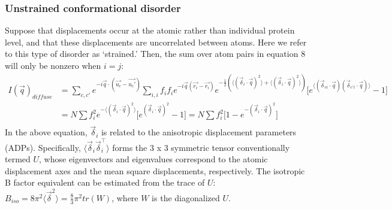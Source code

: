 \documentclass{article}
\begin{document}
\subsubsection{Unstrained conformational disorder} Suppose that displacements occur at the atomic rather than individual protein level, and that these displacements are uncorrelated between atoms. Here we refer to this type of disorder as `strained.' Then, the sum over atom pairs in equation 8 will only be nonzero when $i = j$:
\begin{equation}
\begin{aligned}
I(\vec{q})_{diffuse} & = \sum\limits_{c,c'} e^{-i \vec{q} \cdot (\vec{u_c} - \vec{u_c'})} \sum\limits_{i,i} f_i f_i e^{-i \vec{q} (\vec{r_i} - \vec{r_i})} e^{-\frac{1}{2} (\langle (\vec{\delta}_i \cdot \vec{q})^2 \rangle + \langle (\vec{\delta}_i \cdot \vec{q})^2 \rangle) } \lbrack e^{\langle ( \vec{\delta}_{ci} \cdot \vec{q} ) ( \vec{\delta}_{c'i} \cdot \vec{q} ) \rangle} - 1 \rbrack \\
& = N \sum f_i^2 e^{-\langle (\vec{\delta}_i \cdot \vec{q})^2 \rangle } \lbrack e^{ ( \vec{\delta}_{i} \cdot \vec{q} )^2 } - 1 \rbrack = N \sum f_i^2 \lbrack 1 - e^{- (\vec{\delta}_i \cdot \vec{q})^2 } \rbrack \\
\end{aligned}
\end{equation}
In the above equation, $\vec{\delta}_i$ is related to the anisotropic displacement parameters (ADPs). Specifically, $ \langle \vec{\delta}_i \vec{\delta}_i^\intercal \rangle $ forms the 3 x 3 symmetric tensor conventionally termed $U$, whose eigenvectors and eigenvalues correspond to the atomic displacement axes and the mean square displacements, respectively\footnotemark. The isotropic B factor equivalent can be estimated from the trace of $U$: $B_{iso} = 8\pi^2 \langle \vec{\delta}^2 \rangle = \frac{8}{3} \pi^2 tr(W) $, where $W$ is the diagonalized $U$.

\end{document}
